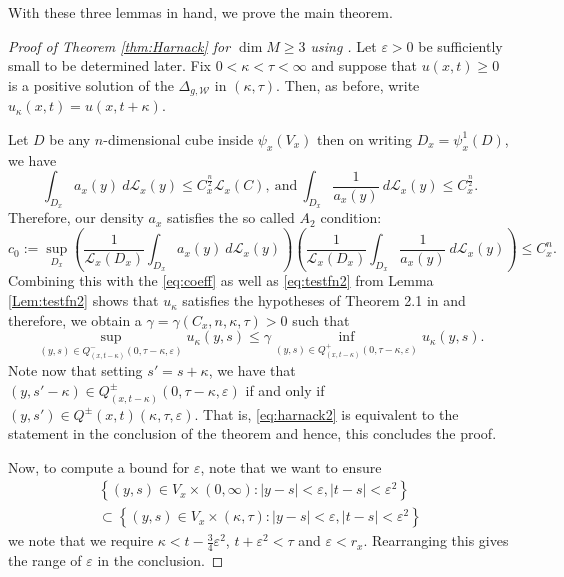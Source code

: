 \documentclass[AMS,STIX1COL]{WileyNJD-v2}
\numberwithin{equation}{section}
\renewcommand{\~}{\tilde}
\renewcommand{\-}{\bar}
\newcommand{\8}{\infty}
\newcommand{\cW}{\mathcal{W}}
\newcommand{\cbrac}[1]{\left(#1\right)}
\newcommand{\dbrac}[1]{\left\{#1\right\}}
\newcommand{\set}[1]{\dbrac{#1}}
\newcommand{\script}[1]{\mathscr{#1}}
\renewcommand{\epsilon}{\varepsilon}
\newcommand{\Leb}[1][{}]{\script{L}^{#1}}			%
\begin{document}
With these three lemmas in hand, we prove the main theorem.

\begin{proof}[Proof of Theorem \ref{thm:Harnack} for $\dim M \geq 3$ using \cite{CS}]
Let $\epsilon > 0$ be sufficiently small to 
be determined later. 
Fix $0 < \kappa < \tau < \infty$ and suppose that $u(x,t) \geq 0$ 
is a positive solution of
the $\Delta_{g,\cW}$ in $(\kappa,\tau)$. 
Then, as before, write $u_\kappa(x,t) = u(x,t+\kappa)$.

Let $D$ be any $n$-dimensional cube inside $\psi_x(V_x)$ then 
on writing $D_x = \psi_x^{1}(D)$, we have  
$$ \int_{D_x} a_x(y)\ d\Leb_x(y) \leq C_x^{\frac{n}{2}} \Leb_x(C),
\ \text{and}\ 
\int_{D_x} \frac{1}{a_x(y)}\ d\Leb_x(y) \leq C_x^{\frac{n}{2}}.$$
Therefore, our density $a_x$ satisfies the so called $A_2$ condition:
$$c_0 := \sup_{D_x} \cbrac{ \frac{1}{\Leb_x(D_x)} \int_{D_x} a_x(y)\ d\Leb_x(y)}
\cbrac{ \frac{1}{\Leb_x(D_x)} \int_{D_x} \frac{1}{a_x(y)}\ d\Leb_x(y)} 
	\leq C_x^n.$$
Combining this with the \eqref{eq:coeff} as
well as \eqref{eq:testfn2} from Lemma \ref{Lem:testfn2} shows that $u_\kappa$
satisfies the hypotheses of Theorem 2.1 in \cite{CS} and
therefore, we obtain a $\gamma = \gamma(C_x, n, \kappa, \tau) > 0$
such that 
\begin{equation} 
\label{eq:harnack2} 
\sup_{(y,s) \in Q_{(x,t-\kappa)}^-(0, \tau - \kappa, \epsilon)} u_\kappa(y,s)
		\leq \gamma \inf_{(y,s) \in Q^+_{(x,t-\kappa)}(0, \tau - \kappa, \epsilon)} u_\kappa(y,s).
\end{equation}
Note now that setting $s' = s + \kappa$, we have that
$(y, s' - \kappa) \in Q^{\pm}_{(x,t- \kappa)}(0, \tau - \kappa, \epsilon)$
if and only if $(y, s') \in Q^{\pm}(x,t)(\kappa, \tau, \epsilon)$.
That is, \eqref{eq:harnack2} is equivalent to the statement 
in the conclusion of the theorem and hence, this concludes
the proof.

Now, to compute a bound for $\epsilon$, note that
we want to ensure 
\begin{multline*}\set{(y,s) \in V_x \times (0, \infty): |y - s| < \epsilon, |t - s| < \epsilon^2} \\
\subset \set{(y,s) \in V_x \times (\kappa, \tau): |y - s| < \epsilon, |t - s| < \epsilon^2}
\end{multline*} 
we note that we require $\kappa < t - \frac{3}{4} \epsilon^2$,
$t + \epsilon^2 < \tau$ and $\epsilon < r_x$.
Rearranging this gives the range of $\epsilon$
in the conclusion.
\end{proof} 
\end{document}

